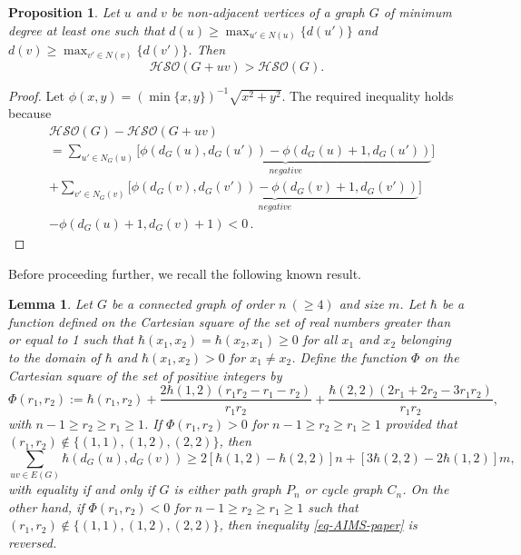 \documentclass[12pt,a4paper]{article}
\newtheorem{proposition}{Proposition}[section]
\newtheorem{lemma}{Lemma}[section]
\begin{document}
\begin{proposition}\label{prop-G+uv>G}
Let $u$ and $v$ be non-adjacent vertices of a graph $G$ of minimum degree at least one such that $d(u)\ge \max_{u'\in N(u)}\{d(u')\}$ and $d(v)\ge \max_{v'\in N(v)}\{d(v')\}$. Then
$$
\mathcal{HSO}(G+uv)
> \mathcal{HSO}(G).
$$
\end{proposition}





\begin{proof}
Let
$\phi(x,y)= (\min\{x,y\})^{-1}\sqrt{x^2+y^2}$. The required inequality holds because
\begin{align*}
&\mathcal{HSO}(G)-\mathcal{HSO}(G+uv)\\[2mm]
&= \sum_{u'\in N_G(u)}\bigg[\underbrace{\phi(d_G(u),d_G(u'))-\phi(d_G(u)+1,d_G(u'))}_{negative}\bigg]\\[2mm]
&+ \sum_{v'\in N_G(v)}\bigg[\underbrace{\phi(d_G(v),d_G(v'))-\phi(d_G(v)+1,d_G(v'))}_{negative}\bigg] \\
& - \phi(d_G(u)+1,d_G(v)+1) <0\,.
\end{align*}
\end{proof}




Before proceeding further, we recall the following known result.

\begin{lemma}\label{lem-m->n-1/n}{\rm \cite{Ali-AIMS-25}}
Let $G$ be a connected graph of order $n\ (\ge4)$ and size $m$. Let $\hbar$ be a function defined on the Cartesian square of the set of real numbers greater than or equal to 1 such that $\hbar(x_1,x_2)=\hbar(x_2,x_1)\ge0$ for all $x_1$ and $x_2$ belonging to the domain of $\hbar$ and $\hbar(x_1,x_2)>0$ for $x_1\ne x_2$.
Define the function $\Phi$ on the Cartesian square of the set of positive integers by
\begin{equation*}
\Phi(r_1,r_2):=  \hbar(r_1,r_2) +\frac{2\hbar(1,2)(r_1r_2-r_1-r_2)}{r_1r_2}   +\frac{\hbar(2,2)(2r_1+2r_2-3r_1r_2)}{r_1r_2},
\end{equation*}
with $n-1\ge r_2\ge r_1\ge 1$.
If $\Phi(r_1,r_2)>0$ for $n-1\ge r_2\ge r_1\ge 1$ provided that $(r_1,r_2)\not\in\{(1,1),(1,2),(2,2)\}$, then
\begin{equation}\label{eq-AIMS-paper}
\sum_{uv\in E(G)} \hbar(d_G(u),d_G(v)) \ge 2[\hbar(1,2)-\hbar(2,2)]n + [3\hbar(2,2)-2\hbar(1,2)]m,
\end{equation}
with equality if and only if $G$ is either path graph $P_n$ or cycle graph $C_n$. On the other hand, if $\Phi(r_1,r_2)<0$ for $n-1\ge r_2\ge r_1\ge 1$ such that $(r_1,r_2)\not\in\{(1,1),(1,2),(2,2)\}$, then inequality \eqref{eq-AIMS-paper} is reversed.
\end{lemma}
\end{document}

